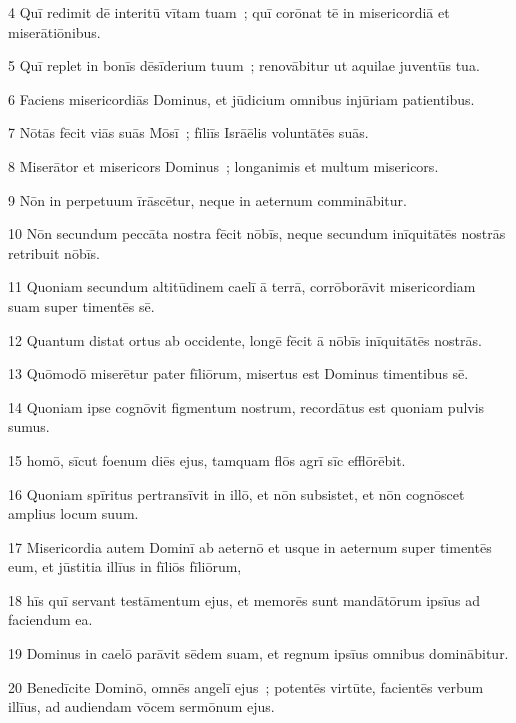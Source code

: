 \psalmVerse
  {\phantom{00}4}
  {Quī redimit dē interitū vītam tuam~; quī corōnat tē in misericordiā et miserātiōnibus.}


\psalmVerse
  {\phantom{00}5}
  {Quī replet in bonīs dēsīderium tuum~; renovābitur ut aquilae juventūs tua.}


\psalmVerse
  {\phantom{00}6}
  {Faciens misericordiās Dominus, et jūdicium omnibus injūriam patientibus.}


\psalmVerse
  {\phantom{00}7}
  {Nōtās fēcit viās suās Mōsī~; fīliīs Isrāēlis voluntātēs suās.}


\psalmVerse
  {\phantom{00}8}
  {Miserātor et misericors Dominus~; longanimis et multum misericors.}


\psalmVerse
  {\phantom{00}9}
  {Nōn in perpetuum īrāscētur, neque in aeternum comminābitur.}


\psalmVerse
  {\phantom{0}10}
  {Nōn secundum peccāta nostra fēcit nōbīs, neque secundum inīquitātēs nostrās retribuit nōbīs.}


\psalmVerse
  {\phantom{0}11}
  {Quoniam secundum altitūdinem caelī ā terrā, corrōborāvit misericordiam suam super timentēs sē.}


\psalmVerse
  {\phantom{0}12}
  {Quantum distat ortus ab occidente, longē fēcit ā nōbīs inīquitātēs nostrās.}


\psalmVerse
  {\phantom{0}13}
  {Quōmodō miserētur pater fīliōrum, misertus est Dominus timentibus sē.}


\psalmVerse
  {\phantom{0}14}
  {Quoniam ipse cognōvit figmentum nostrum, recordātus est quoniam pulvis sumus.}


\psalmVerse
  {\phantom{0}15}
  {homō, sīcut foenum diēs ejus, tamquam flōs agrī sīc efflōrēbit.}


\psalmVerse
  {\phantom{0}16}
  {Quoniam spīritus pertransīvit in illō, et nōn subsistet, et nōn cognōscet amplius locum suum.}


\psalmVerse
  {\phantom{0}17}
  {Misericordia autem Dominī ab aeternō et usque in aeternum super timentēs eum, et jūstitia illīus in fīliōs fīliōrum,}


\psalmVerse
  {\phantom{0}18}
  {hīs quī servant testāmentum ejus, et memorēs sunt mandātōrum ipsīus ad faciendum ea.}


\psalmVerse
  {\phantom{0}19}
  {Dominus in caelō parāvit sēdem suam, et regnum ipsīus omnibus dominābitur.}


\psalmVerse
  {\phantom{0}20}
  {Benedīcite Dominō, omnēs angelī ejus~; potentēs virtūte, facientēs verbum illīus, ad audiendam vōcem sermōnum ejus.}


